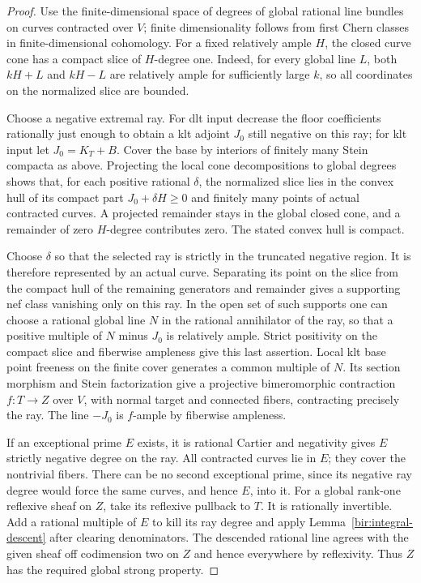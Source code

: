 \begin{proof}
Use the finite-dimensional space of degrees of global rational line
bundles on curves contracted over $V$; finite dimensionality follows
from first Chern classes in finite-dimensional cohomology.  For a
fixed relatively ample $H$, the closed curve cone has a compact slice
of $H$-degree one.  Indeed, for every global line $L$, both
$kH+L$ and $kH-L$ are relatively ample for sufficiently large $k$, so
all coordinates on the normalized slice are bounded.

Choose a negative extremal ray.  For dlt input decrease the floor
coefficients rationally just enough to obtain a klt adjoint $J_0$
still negative on this ray; for klt input let $J_0=K_T+B$.  Cover the
base by interiors of finitely many Stein compacta as above.  Projecting
the local cone decompositions to global degrees shows that, for each
positive rational $\delta$, the normalized slice lies in the convex
hull of its compact part $J_0+\delta H\geq0$ and finitely many points
of actual contracted curves.  A projected remainder stays in the
global closed cone, and a remainder of zero $H$-degree contributes
zero.  The stated convex hull is compact.

Choose $\delta$ so that the selected ray is strictly in the truncated
negative region.  It is therefore represented by an actual curve.
Separating its point on the slice from the compact hull of the
remaining generators and remainder gives a supporting nef class
vanishing only on this ray.  In the open set of such supports one can
choose a rational global line $N$ in the rational annihilator of the
ray, so that a positive multiple of $N$ minus $J_0$ is relatively
ample.  Strict positivity on the compact slice and fiberwise
ampleness give this last assertion.  Local klt base point freeness on
the finite cover generates a common multiple of $N$.  Its section
morphism and Stein factorization give a projective bimeromorphic
contraction $f:T\to Z$ over $V$, with normal target and connected
fibers, contracting precisely the ray.  The line $-J_0$ is
$f$-ample by fiberwise ampleness.

If an exceptional prime $E$ exists, it is rational Cartier and
negativity gives $E$ strictly negative degree on the ray.  All
contracted curves lie in $E$; they cover the nontrivial fibers.  There
can be no second exceptional prime, since its negative ray degree
would force the same curves, and hence $E$, into it.  For a global
rank-one reflexive sheaf on $Z$, take its reflexive pullback to $T$.
It is rationally invertible.  Add a rational multiple of $E$ to kill
its ray degree and apply Lemma~\ref{bir:integral-descent} after
clearing denominators.  The descended rational line agrees with the
given sheaf off codimension two on $Z$ and hence everywhere by
reflexivity.  Thus $Z$ has the required global strong property.


\end{proof}
